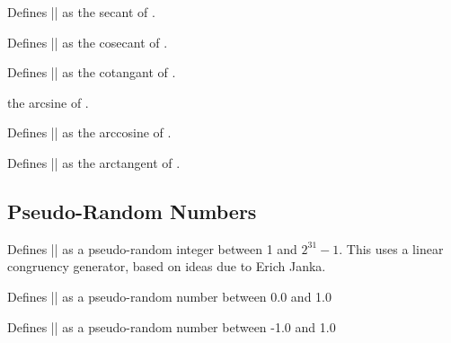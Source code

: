 \begin{command}{}
	Defines |\pgfmathresult| as the secant of .
\end{command}

\begin{command}{}  
	Defines |\pgfmathresult| as the cosecant of .  
\end{command}

\begin{command}{}  
	Defines |\pgfmathresult| as the cotangant of .  
\end{command}

\begin{command}{}
	the arcsine of .
\end{command}

\begin{command}{}
	Defines |\pgfmathresult| as the arccosine of .
\end{command}

\begin{command}{}
 	Defines |\pgfmathresult| as the arctangent of .
\end{command}



\subsection{Pseudo-Random Numbers}

\label{pgfmath-random}


\begin{command}{\pgfmathgeneratepseudorandomnumber}
	Defines |\pgfmathresult| as a pseudo-random integer between 1 and 
	$2^{31}-1$. This uses a linear congruency generator, based on ideas
	due to Erich Janka.
\end{command}

\begin{command}{\pgfmathrnd}
	Defines |\pgfmathresult| as a pseudo-random number between 0.0 and 1.0
\end{command}

\begin{command}{\pgfmathrand}
	Defines |\pgfmathresult| as a pseudo-random number between -1.0 and 1.0
\end{command}

